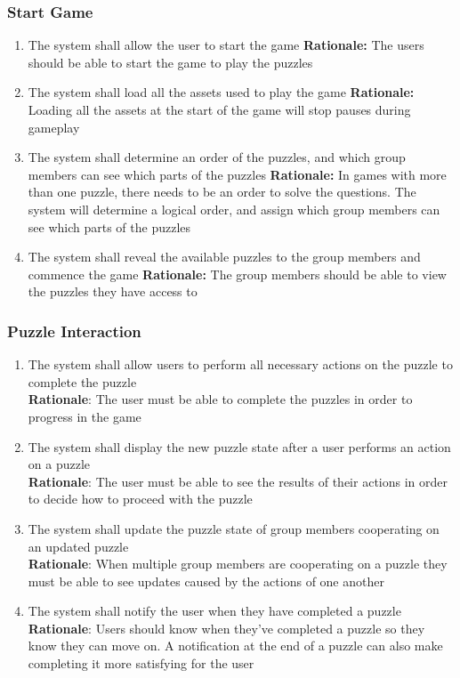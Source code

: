 \documentclass[12pt]{article}
\begin{document}
\subsubsection{Start Game}
\begin{enumerate}[label=ST\arabic*., series=StartGame]
	\item The system shall allow the user to start the game\newline 
    \textbf{Rationale:} The users should be able to start the game to play the puzzles
    \item The system shall load all the assets used to play the game\newline 
    \textbf{Rationale:} Loading all the assets at the start of the game will stop pauses during gameplay
    \item The system shall determine an order of the puzzles, and which group members can see which parts of the puzzles\newline 
    \textbf{Rationale:} In games with more than one puzzle, there needs to be an order to solve the questions. The system will determine a logical order, and assign which group members can see which parts of the puzzles
    \item The system shall reveal the available puzzles to the group members and commence the game\newline 
    \textbf{Rationale:} The group members should be able to view the puzzles they have access to
\end{enumerate}

\subsubsection{Puzzle Interaction}
    \begin{enumerate}[label=PI\arabic*., series=PuzzleInteract]
        \item The system shall allow users to perform all necessary actions on the puzzle to complete the puzzle\\
        \textbf{Rationale}: The user must be able to complete the puzzles in order to progress in the game
        \item The system shall display the new puzzle state after a user performs an action on a puzzle\\
        \textbf{Rationale}: The user must be able to see the results of their actions in order to decide how to proceed with the puzzle
        \item The system shall update the puzzle state of group members cooperating on an updated puzzle\\
        \textbf{Rationale}: When multiple group members are cooperating on a puzzle they must be able to see updates caused by the actions of one another
        \item The system shall notify the user when they have completed a puzzle\\
        \textbf{Rationale}: Users should know when they've completed a puzzle so they know they can move on. A notification at the end of a puzzle can also make completing it more satisfying for the user
    \end{enumerate}
\end{document}
